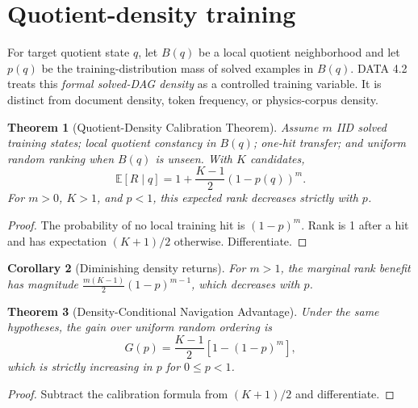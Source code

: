 \documentclass[11pt]{article}
\newtheorem{theorem}{Theorem}[section]\newtheorem{corollary}[theorem]{Corollary}\newtheorem{proposition}[theorem]{Proposition}\newtheorem{conjecture}[theorem]{Conjecture}\newtheorem{definition}[theorem]{Definition}\newtheorem{remark}[theorem]{Remark}
\newcommand{\E}{\mathbb E}\newcommand{\Prob}{\mathbb P}\newcommand{\Qcal}{\mathcal Q}\newcommand{\Hcal}{\mathcal H}
\begin{document}
\section{Quotient-density training}
For target quotient state $q$, let $B(q)$ be a local quotient neighborhood and let $p(q)$ be the training-distribution mass of solved examples in $B(q)$. DATA 4.2 treats this \emph{formal solved-DAG density} as a controlled training variable. It is distinct from document density, token frequency, or physics-corpus density.
\begin{theorem}[Quotient-Density Calibration Theorem]Assume $m$ IID solved training states; local quotient constancy in $B(q)$; one-hit transfer; and uniform random ranking when $B(q)$ is unseen. With $K$ candidates, \[\E[R\mid q]=1+\frac{K-1}{2}(1-p(q))^m.\] For $m>0$, $K>1$, and $p<1$, this expected rank decreases strictly with $p$.\end{theorem}
\begin{proof}The probability of no local training hit is $(1-p)^m$. Rank is 1 after a hit and has expectation $(K+1)/2$ otherwise. Differentiate.\end{proof}
\begin{corollary}[Diminishing density returns]For $m>1$, the marginal rank benefit has magnitude $\frac{m(K-1)}2(1-p)^{m-1}$, which decreases with $p$.\end{corollary}
\begin{theorem}[Density-Conditional Navigation Advantage]Under the same hypotheses, the gain over uniform random ordering is \[G(p)=\frac{K-1}{2}\left[1-(1-p)^m\right],\] which is strictly increasing in $p$ for $0\le p<1$.\end{theorem}
\begin{proof}Subtract the calibration formula from $(K+1)/2$ and differentiate.\end{proof}
\end{document}
